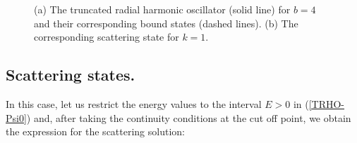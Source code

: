 \documentclass[a4paper]{jpconf}
\begin{document}
\begin{figure}
\centering
{}%
\hfill%
%
 \caption{\label{TRHO-Figure} (a) The truncated radial harmonic oscillator (solid line) for $b=4$ and their corresponding bound states (dashed lines). (b) The corresponding scattering state for $k=1$.}
\end{figure}


\subsection{Scattering states.}

In this case, let us restrict the energy values to the interval $E>0$ in (\ref{TRHO-Psi0}) and, after taking the continuity conditions at the cut off point, we obtain the expression for the scattering solution:
\end{document}
